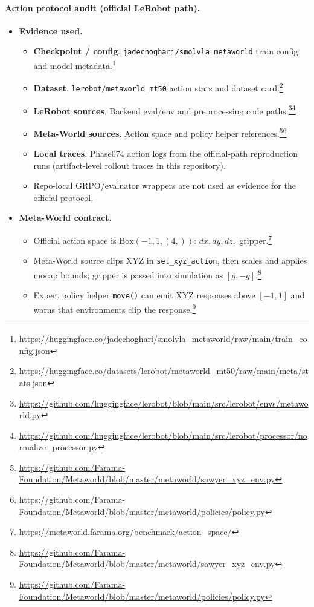 \documentclass{article}
\begin{document}
\paragraph{Action protocol audit (official LeRobot path).}
\begin{itemize}
  \item \textbf{Evidence used.}
  \begin{itemize}
    \item \textbf{Checkpoint / config}. \texttt{jadechoghari/smolvla\_metaworld} train config and model metadata.\footnote{\url{https://huggingface.co/jadechoghari/smolvla_metaworld/raw/main/train_config.json}}
    \item \textbf{Dataset}. \texttt{lerobot/metaworld\_mt50} action stats and dataset card.\footnote{\url{https://huggingface.co/datasets/lerobot/metaworld_mt50/raw/main/meta/stats.json}}
    \item \textbf{LeRobot sources}. Backend eval/env and preprocessing code paths.\footnote{\url{https://github.com/huggingface/lerobot/blob/main/src/lerobot/envs/metaworld.py}}\footnote{\url{https://github.com/huggingface/lerobot/blob/main/src/lerobot/processor/normalize_processor.py}}
    \item \textbf{Meta-World sources}. Action space and policy helper references.\footnote{\url{https://github.com/Farama-Foundation/Metaworld/blob/master/metaworld/sawyer_xyz_env.py}}\footnote{\url{https://github.com/Farama-Foundation/Metaworld/blob/master/metaworld/policies/policy.py}}
    \item \textbf{Local traces}. Phase074 action logs from the official-path reproduction runs (artifact-level rollout traces in this repository).
    \item Repo-local GRPO/evaluator wrappers are not used as evidence for the official protocol.
  \end{itemize}
  \item \textbf{Meta-World contract.}
  \begin{itemize}
    \item Official action space is \(\mathrm{Box}(-1,1,(4,))\): \(dx,dy,dz,\) gripper.\footnote{\url{https://metaworld.farama.org/benchmark/action_space/}}
    \item Meta-World source clips XYZ in \texttt{set\_xyz\_action}, then scales and applies mocap bounds; gripper is passed into simulation as \([g,-g]\).\footnote{\url{https://github.com/Farama-Foundation/Metaworld/blob/master/metaworld/sawyer_xyz_env.py}}
    \item Expert policy helper \texttt{move()} can emit XYZ responses above \([-1,1]\) and warns that environments clip the response.\footnote{\url{https://github.com/Farama-Foundation/Metaworld/blob/master/metaworld/policies/policy.py}}

\end{itemize}
\end{itemize}
\end{document}
